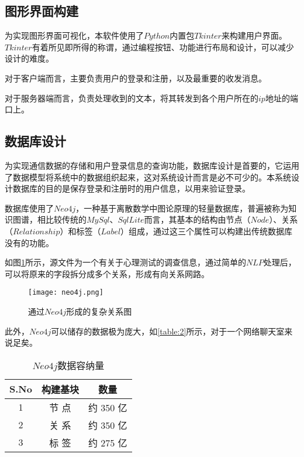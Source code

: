 \documentclass[forprint]{sql}
\begin{document}
\subsection{图形界面构建}

为实现图形界面可视化，本软件使用了$Python$内置包$Tkinter$来构建用户界面。$Tkinter$有着所见即所得的称谓，通过编程按钮、功能进行布局和设计，可以减少设计的难度。

对于客户端而言，主要负责用户的登录和注册，以及最重要的收发消息。

对于服务器端而言，负责处理收到的文本，将其转发到各个用户所在的$ip$地址的端口上。

\subsection{数据库设计}

为实现通信数据的存储和用户登录信息的查询功能，数据库设计是首要的，它运用了数据模型将系统中的数据组织起来，这对系统设计而言是必不可少的。本系统设计数据库的目的是保存登录和注册时的用户信息，以用来验证登录。

数据库使用了$ Neo4j $，一种基于离散数学中图论原理的轻量数据库，普遍被称为知识图谱，相比较传统的$MySql$、$SqlLite$而言，其基本的结构由节点（$Node$）、关系（$Relationship$）和标签（$Label$）组成，通过这三个属性可以构建出传统数据库没有的功能。

如图\ref{fig:10}所示，源文件为一个有关于心理测试的调查信息，通过简单的$NLP$处理后，可以将原来的字段拆分成多个关系，形成有向关系网路。

\begin{figure}[ht]
	\centering
	\texttt{[image: neo4j.png]}
	\caption{通过$ Neo4j $形成的复杂关系图}
	\label{fig:10}
\end{figure}

此外，$Neo4j$可以储存的数据极为庞大，如\ref{table:2}所示，对于一个网络聊天室来说足矣。

\begin{table}[ht]\centering
	\caption{$Neo4j$数据容纳量}
	\label{table:3}
	\begin{tabular}{ccc}
		\hline
		S.No & 构建基块 & 数量      \\ \hline
		1    & 节  点 & 约 350 亿 \\
		2    & 关  系 & 约 350 亿 \\
		3    & 标  签 & 约 275 亿 \\ \hline
		
	\end{tabular}
\end{table}
\clearpage
\end{document}
